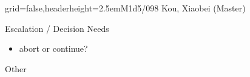 \documentclass[english]{kiesgrube}
\begin{document}
\begin{poster}{grid=false,headerheight=2.5em}{}{M1d5/098 Kou, Xiaobei (Master)}{}{}
\begin{posterbox}[name=escalation,column=1,below=risks]{Escalation / Decision Needs}
\begin{itemize}
\item abort or continue?
\end{itemize}
\end{posterbox}
\begin{posterbox}[name=other,column=1,below=escalation]{Other}
\end{posterbox}
\footer{}
\end{poster}
\end{document}
